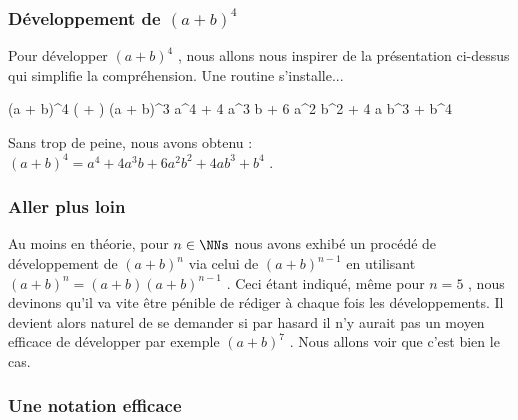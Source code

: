 

\subsubsection{Développement de $(a + b)^4$}

Pour développer $(a + b)^4$ , nous allons nous inspirer de la présentation ci-dessus qui simplifie la compréhension. Une routine s'installe...

\medskip

\begin{stepcalc}[style = sar]
	(a + b)^4
		\explnext{}
	( + ) (a + b)^3
		\explnext{}
		\explnext[\hideit+]{}
	\phantom{x}\kern4pt%
		\explnext{}
		\explnext[\hideit+]{}
	\phantom{x}\kern4pt%
		\explnext{}
		\explnext[\hideit+]{}
	\phantom{x}\kern4pt%
		\explnext{}
	a^4 + 4 a^3 b + 6 a^2 b^2 + 4 a b^3 + b^4
\end{stepcalc}

\medskip

Sans trop de peine, nous avons obtenu :
$(a + b)^4 = a^4 + 4 a^3 b + 6 a^2 b^2 + 4 a b^3 + b^4$ .




\subsubsection{Aller plus loin}

Au moins en théorie, pour $n \in \NNs$ nous avons exhibé un procédé de développement de $(a + b)^n$ via celui de $(a + b)^{n - 1}$ en utilisant $(a + b)^n = (a + b) (a + b)^{n - 1}$ .
Ceci étant indiqué, même pour $n = 5$ , nous devinons qu'il va vite être pénible de rédiger à chaque fois les développements.
Il devient alors naturel de se demander si par hasard il n'y aurait pas un moyen efficace de développer par exemple $(a + b)^7$ . Nous allons voir que c'est bien le cas.




\subsubsection{Une notation efficace}

